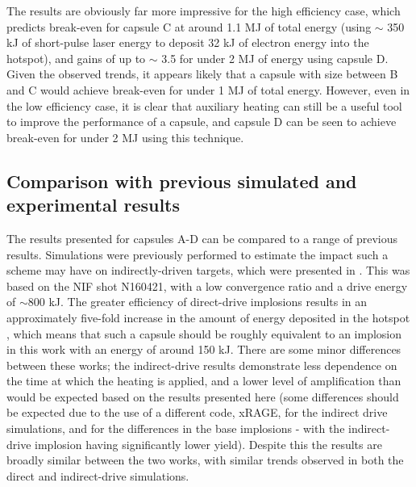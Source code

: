 The results are obviously far more impressive for the high efficiency case, which predicts break-even for capsule C at around 1.1 MJ of total energy (using $\sim$ 350 kJ of short-pulse laser energy to deposit 32 kJ of electron energy into the hotspot), and gains of up to $\sim$ 3.5 for under 2 MJ of energy using capsule D. Given the observed trends, it appears likely that a capsule with size between B and C would achieve break-even for under 1 MJ of total energy. However, even in the low efficiency case, it is clear that auxiliary heating can still be a useful tool to improve the performance of a capsule, and capsule D can be seen to achieve break-even for under 2 MJ using this technique.

\subsection{Comparison with previous simulated and experimental results}

The results presented for capsules A-D can be compared to a range of previous results. Simulations were previously performed to estimate the impact such a scheme may have on indirectly-driven targets, which were presented in \cite{Norreys2021}. This was based on the NIF shot N160421, with a low convergence ratio and a drive energy of $\sim 800$ kJ. The greater efficiency of direct-drive implosions results in an approximately five-fold increase in the amount of energy deposited in the hotspot \cite{Campbell2017, Goncharov2016}, which means that such a capsule should be roughly equivalent to an implosion in this work with an energy of around 150 kJ. There are some minor differences between these works; the indirect-drive results demonstrate less dependence on the time at which the heating is applied, and a lower level of amplification than would be expected based on the results presented here (some differences should be expected due to the use of a different code, xRAGE, for the indirect drive simulations, and for the differences in the base implosions - with the indirect-drive implosion having significantly lower yield). Despite this the results are broadly similar between the two works, with similar trends observed in both the direct and indirect-drive simulations.

